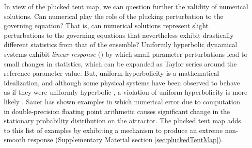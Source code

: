 In view of the plucked tent map, we can question further the
validity of numerical solutions. Can numerical play 
the role of the plucking perturbation to the 
governing equation? That is, can numerical solutions represent 
slight perturbations to the governing equations that nevertheless 
exhibit drastically different statistics from that of the ensemble? Uniformly hyperbolic 
dynamical systems exhibit \emph{linear response} 
(\cite{ruelle}\cite{baladi}) by which small parameter perturbations 
lead to small changes in statistics, which can be expanded as Taylor series around the reference parameter value. But, uniform hyperbolicity is a mathematical idealization, and although some physical systems have been observed to behave as if they were uniformly hyperbolic \cite{gallavotti}, a violation of uniform hyperbolicity is more likely 
\cite{wormell}\cite{luca}. Sauer \cite{sauer} has shown 
examples in which numerical error due to computation in double-precision floating point arithmetic causes significant change in the stationary probability distribution on the attractor. The plucked tent map adds to this list of examples by exhibiting a mechanism to produce an extreme non-smooth response (Supplementary Material section \ref{sec:pluckedTentMap}).

